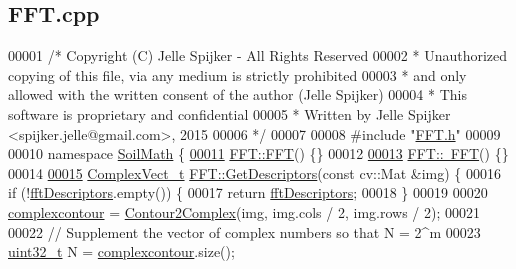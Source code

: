 \hypertarget{_f_f_t_8cpp_source}{}\subsection{F\+F\+T.\+cpp}
\label{_f_f_t_8cpp_source}

\begin{DoxyCode}
00001 \textcolor{comment}{/* Copyright (C) Jelle Spijker - All Rights Reserved}
00002 \textcolor{comment}{ * Unauthorized copying of this file, via any medium is strictly prohibited}
00003 \textcolor{comment}{ * and only allowed with the written consent of the author (Jelle Spijker)}
00004 \textcolor{comment}{ * This software is proprietary and confidential}
00005 \textcolor{comment}{ * Written by Jelle Spijker <spijker.jelle@gmail.com>, 2015}
00006 \textcolor{comment}{ */}
00007 
00008 \textcolor{preprocessor}{#include "\hyperlink{_f_f_t_8h}{FFT.h}"}
00009 
00010 \textcolor{keyword}{namespace }\hyperlink{namespace_soil_math}{SoilMath} \{
\hypertarget{_f_f_t_8cpp_source_l00011}{}\hyperlink{class_soil_math_1_1_f_f_t_a52638bf8f971d1448e46b2b6db5f5e8b}{00011} \hyperlink{class_soil_math_1_1_f_f_t_a52638bf8f971d1448e46b2b6db5f5e8b}{FFT::FFT}() \{\}
00012 
\hypertarget{_f_f_t_8cpp_source_l00013}{}\hyperlink{class_soil_math_1_1_f_f_t_a279862b286d865ebc5aa707f94f19d73}{00013} \hyperlink{class_soil_math_1_1_f_f_t_a279862b286d865ebc5aa707f94f19d73}{FFT::~FFT}() \{\}
00014 
\hypertarget{_f_f_t_8cpp_source_l00015}{}\hyperlink{class_soil_math_1_1_f_f_t_af5fb6f4804079ee184a314e2f0a0f2fc}{00015} \hyperlink{_soil_math_types_8h_a7567e521c2b2c408dcb62dbff72390f7}{ComplexVect\_t} \hyperlink{class_soil_math_1_1_f_f_t_af5fb6f4804079ee184a314e2f0a0f2fc}{FFT::GetDescriptors}(\textcolor{keyword}{const} cv::Mat &img) \{
00016   \textcolor{keywordflow}{if} (!\hyperlink{class_soil_math_1_1_f_f_t_a466b360529319d0e6e3220f446f703be}{fftDescriptors}.empty()) \{
00017     \textcolor{keywordflow}{return} \hyperlink{class_soil_math_1_1_f_f_t_a466b360529319d0e6e3220f446f703be}{fftDescriptors};
00018   \}
00019 
00020   \hyperlink{class_soil_math_1_1_f_f_t_a48141f0c777ca86f2e536f88b509b639}{complexcontour} = \hyperlink{class_soil_math_1_1_f_f_t_a18a95490ea8e929584c2af6569dec3b6}{Contour2Complex}(img, img.cols / 2, img.rows / 2);
00021 
00022   \textcolor{comment}{// Supplement the vector of complex numbers so that N = 2^m}
00023   \hyperlink{_soil_math_types_8h_a435d1572bf3f880d55459d9805097f62}{uint32\_t} N = \hyperlink{class_soil_math_1_1_f_f_t_a48141f0c777ca86f2e536f88b509b639}{complexcontour}.size();

\end{DoxyCode}
